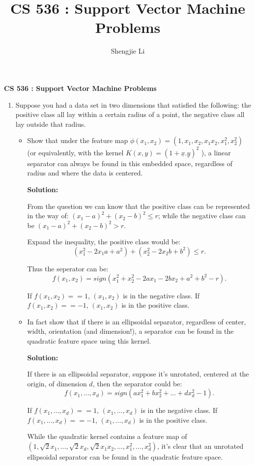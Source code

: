 \documentclass[letter, 12pt]{article}
\author{Shengjie Li}
\title{CS 536 : Support Vector Machine Problems}
\begin{document}
    \centerline{\textbf{CS 536 : Support Vector Machine Problems}}
    \begin{enumerate}
    	\item{Suppose you had a data set in two dimensions that satisfied the following: the positive class all lay within a certain radius of a point, the negative class all lay outside that radius.}
    	\begin{itemize}
    		\item{Show that under the feature map $ \phi(x_1 , x_2 ) = (1, x_1 , x_2 , x_1 x_2 , x_{1}^2 , x_{2}^2 ) $ (or equivalently, with the kernel $ K(x, y) = (1 + \underline{x}.\underline{y})^2 $ ), a linear separator can always be found in this embedded space, regardless of radius and where the data is centered.}
    		\par{\textbf{Solution:}}
    		\par{From the question we can know that the positive class can be represented in the way of: $ (x_1 - a)^2 + (x_2 - b)^2 \le r $; while the negative class can be $ (x_1 - a)^2 + (x_2 - b)^2 > r $.}
    		\par{Expand the inequality, the positive class would be:}
    			\[(x_1^2 - 2 x_1 a + a^2) + (x_2^2 - 2 x_2 b + b^2) \le r. \]
    		\par{Thus the seperator can be:}
    			\[f(x_1, x_2) = sign(x_1^2 + x_2^2 - 2a x_1 - 2b x_2 + a^2 + b^2 - r). \]
    		\par{If $ f(x_1, x_2) == 1 $, $ (x_1, x_2) $ is in the negative class. If $ f(x_1, x_2) == -1 $, $ (x_1, x_2) $ is in the positive class.}
    		\item{In fact show that if there is an ellipsoidal separator, regardless of center, width, orientation (and dimension!), a separator can be found in the quadratic feature space using this kernel.}
    		\par{\textbf{Solution:}}
    		\par{If there is an ellipsoidal separator, suppose it's unrotated, centered at the origin, of dimension $ d $, then the separator could be:}
    		\[ f(x_1, \dots, x_d) = sign(ax_1^2 + bx_2^2 + \dots + dx_d^2 - 1). \]
    		\par{If $ f(x_1, \dots, x_d) == 1 $, $ (x_1, \dots, x_d) $ is in the negative class. If $ f(x_1, \dots, x_d) == -1 $, $ (x_1, \dots, x_d) $ is in the positive class.}
    		\par{While the quadratic kernel contains a feature map of $ (1, \sqrt{2}x_1, \dots, \sqrt{2}x_d, \sqrt{2}x_1x_2, \dots, x_1^2, \dots, x_d^2)$, it's clear that an unrotated ellipsoidal separator can be found in the quadratic feature space.}

\end{itemize}
\end{enumerate}
\end{document}
